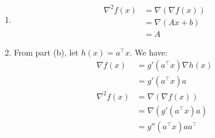 \begin{enumerate}
    \item \begin{answer}
        \begin{align*}
            \nabla ^2 f(x) &= \nabla(\nabla f(x)) \\
            &= \nabla(Ax + b) \\
            &= A
        \end{align*}
    \end{answer}

    \item \begin{answer}
    From part (b), let $h(x) = a^{\top}x$. We have:
        \begin{align*}
            \nabla f(x) &= g'(a^{\top}x) \nabla h(x) \\
            &= g'(a^{\top}x) a \\
            \nabla ^2 f(x) &= \nabla(\nabla f(x)) \\
            &= \nabla (g'(a^{\top}x) a) \\
            &= g''(a^{\top}x) a a^{\top}
        \end{align*}
    \end{answer}
\end{enumerate}
